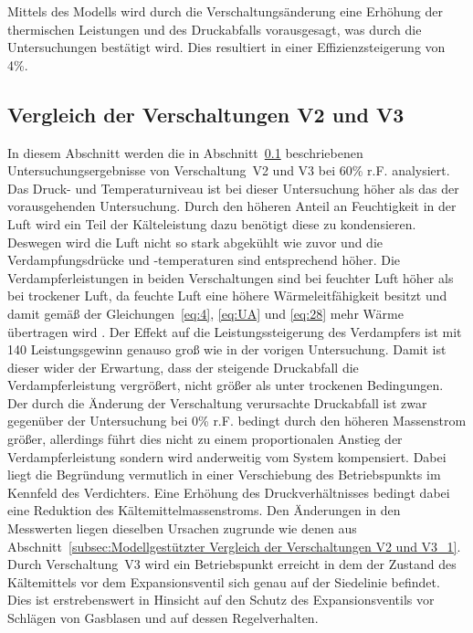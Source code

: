 Mittels des Modells wird durch die Verschaltungsänderung eine Erhöhung der thermischen Leistungen und des Druckabfalls vorausgesagt, was durch die Untersuchungen bestätigt wird. Dies resultiert in einer Effizienzsteigerung von \unit{4}{\%}. 

\subsection{Vergleich der Verschaltungen V2 und V3}
\label{subsec:Vergleich der Verschaltungen V2 und V3_1}

In diesem Abschnitt werden die in Abschnitt~\ref{subsec:Vergleich der Verschaltungen V2 und V3_1} beschriebenen Untersuchungsergebnisse von Verschaltung~V2 und V3 bei \unit{60}{\%} r.F. analysiert.
Das Druck- und Temperaturniveau ist bei dieser Untersuchung höher als das der vorausgehenden Untersuchung. Durch den höheren Anteil an Feuchtigkeit in der Luft wird ein Teil der Kälteleistung dazu benötigt diese zu kondensieren. Deswegen wird die Luft nicht so stark abgekühlt wie zuvor und die Verdampfungsdrücke und -temperaturen sind entsprechend höher. Die Verdampferleistungen in beiden Verschaltungen sind bei feuchter Luft höher als bei trockener Luft, da feuchte Luft eine höhere Wärmeleitfähigkeit besitzt und damit gemäß der Gleichungen~\ref{eq:4}, \ref{eq:UA} und \ref{eq:28} mehr Wärme übertragen wird \cite{Lasance.2003}. Der Effekt auf die Leistungssteigerung des Verdampfers ist mit \unit{140}{\watt} Leistungsgewinn genauso groß wie in der vorigen Untersuchung. Damit ist dieser wider der Erwartung, dass der steigende Druckabfall die Verdampferleistung vergrößert, nicht größer als unter trockenen Bedingungen. Der durch die Änderung der Verschaltung verursachte Druckabfall ist zwar gegenüber der Untersuchung bei \unit{0}{\%} r.F. bedingt durch den höheren Massenstrom größer, allerdings führt dies nicht zu einem proportionalen Anstieg der Verdampferleistung sondern wird anderweitig vom System kompensiert. Dabei liegt die Begründung vermutlich in einer Verschiebung des Betriebspunkts im Kennfeld des Verdichters. Eine Erhöhung des Druckverhältnisses bedingt dabei eine Reduktion des Kältemittelmassenstroms.
Den Änderungen in den Messwerten liegen dieselben Ursachen zugrunde wie denen aus Abschnitt~\ref{subsec:Modellgestützter Vergleich der Verschaltungen V2 und V3_1}.
Durch Verschaltung~V3 wird ein Betriebspunkt erreicht in dem der Zustand des Kältemittels vor dem Expansionsventil sich genau auf der Siedelinie befindet. 
Dies ist erstrebenswert in Hinsicht auf den Schutz des Expansionsventils vor Schlägen von Gasblasen und auf dessen Regelverhalten. \newline
